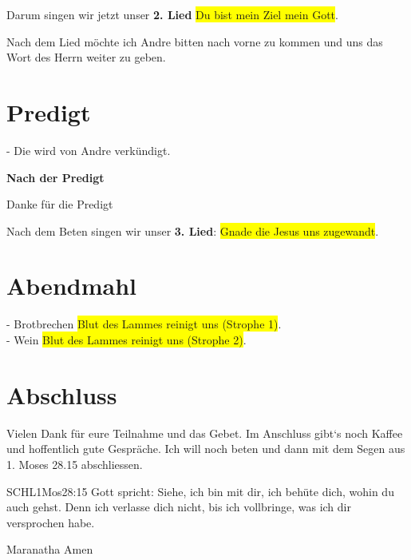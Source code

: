 \begin{spacing}{1.5}

\end{spacing}
Darum singen wir jetzt unser \textbf{2. Lied} \colorbox{yellow}{Du bist mein Ziel mein Gott}.

Nach dem Lied möchte ich Andre bitten nach vorne zu kommen und uns das Wort des Herrn weiter zu geben.

\section{Predigt}
- Die wird von Andre verkündigt.

\textbf{Nach der Predigt}

Danke für die Predigt

Nach dem Beten singen wir unser \textbf{3. Lied}: \colorbox{yellow}{Gnade die Jesus uns zugewandt}.\\

\section{Abendmahl}
- Brotbrechen
\colorbox{yellow}{Blut des Lammes reinigt uns (Strophe 1)}.\\
- Wein
\colorbox{yellow}{Blut des Lammes reinigt uns (Strophe 2)}.\\

\section{Abschluss}
Vielen Dank für eure Teilnahme und das Gebet. Im Anschluss gibt`s noch Kaffee und hoffentlich gute Gespräche.
Ich will noch beten und dann mit dem Segen aus 1. Moses 28.15 abschliessen.
\begin{bibelbox}{SCHL}{1Mos}{28:15}
Gott spricht: Siehe, ich bin mit dir,
ich behüte dich, wohin du auch gehst.
Denn ich verlasse dich nicht,
bis ich vollbringe, was ich dir versprochen habe.
\end{bibelbox}
Maranatha Amen
